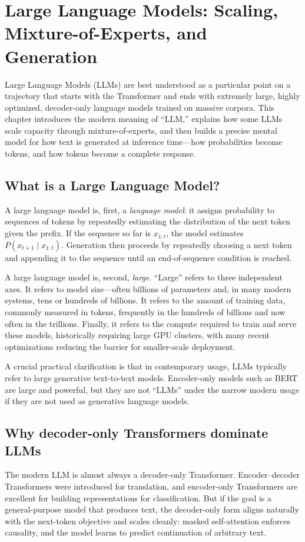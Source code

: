 
\chapter{Large Language Models: Scaling, Mixture-of-Experts, and Generation}
\label{chap:llms-scaling-moe-generation}

Large Language Models (LLMs) are best understood as a particular point on a trajectory that starts with the Transformer and ends with extremely large, highly optimized, decoder-only language models trained on massive corpora. This chapter introduces the modern meaning of “LLM,” explains how some LLMs scale capacity through mixture-of-experts, and then builds a precise mental model for how text is generated at inference time—how probabilities become tokens, and how tokens become a complete response.

\section{What is a Large Language Model?}
A large language model is, first, a \emph{language model}: it assigns probability to sequences of tokens by repeatedly estimating the distribution of the next token given the prefix. If the sequence so far is \(x_{1:t}\), the model estimates \(P(x_{t+1}\mid x_{1:t})\). Generation then proceeds by repeatedly choosing a next token and appending it to the sequence until an end-of-sequence condition is reached.

A large language model is, second, \emph{large}. “Large” refers to three independent axes. It refers to model size—often billions of parameters and, in many modern systems, tens or hundreds of billions. It refers to the amount of training data, commonly measured in tokens, frequently in the hundreds of billions and now often in the trillions. Finally, it refers to the compute required to train and serve these models, historically requiring large GPU clusters, with many recent optimizations reducing the barrier for smaller-scale deployment.

A crucial practical clarification is that in contemporary usage, LLMs typically refer to large generative text-to-text models. Encoder-only models such as BERT are large and powerful, but they are not “LLMs” under the narrow modern usage if they are not used as generative language models.

\section{Why decoder-only Transformers dominate LLMs}
The modern LLM is almost always a decoder-only Transformer. Encoder--decoder Transformers were introduced for translation, and encoder-only Transformers are excellent for building representations for classification. But if the goal is a general-purpose model that produces text, the decoder-only form aligns naturally with the next-token objective and scales cleanly: masked self-attention enforces causality, and the model learns to predict continuation of arbitrary text.

